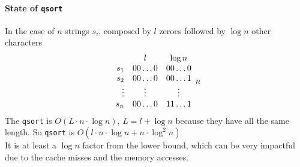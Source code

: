 \documentclass[10pt]{report}
\begin{document}
\paragraph{State of \texttt{qsort}} In the case of $n$ strings $s_i$, composed by $l$ zeroes followed by $\log n$ other characters
$$\begin{array}{r c c}
 & l & \log n\\
s_1 & 00\ldots 0 & 00\ldots 0\\
s_2 & 00\ldots 0 & 00\ldots 1\\
\vdots & \vdots & \vdots\\
s_n & 00\ldots 0 & 11\ldots 1\\
\end{array} n$$
The \texttt{qsort} is $O(L\cdot n\cdot \log n)$, $L= l+\log n$ because they have all the same length. So \texttt{qsort} is $O(l\cdot n\cdot\log n + n\cdot\log^2n)$\\
It is at least a $\log n$ factor from the lower bound, which can be very impactful due to the cache misses and the memory accesses.
\end{document}
